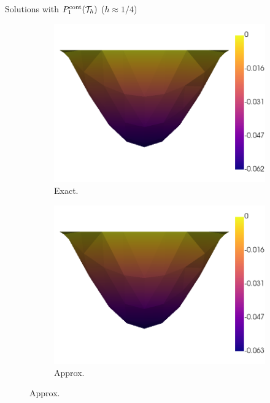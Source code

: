\begin{frame}{Solutions with $\relax{P}^{\text{cont}}_1(\mathcal{T}_h)$ ($h\approx 1/4$)}
	\begin{figure}[h!]
		\begin{subfigure}{0.49\textwidth}
			\centering
			\includegraphics[scale=0.2]{img/Difusion/diff_u_ex_nx-4.png}
			\caption{Exact.}
		\end{subfigure}
		\begin{subfigure}{0.49\textwidth}
			\centering
			\includegraphics[scale=0.2]{img/Difusion/diff_u_FE_nx-4.png}
			\caption{Approx.}
		\end{subfigure}
	\end{figure}
	\end{frame}
